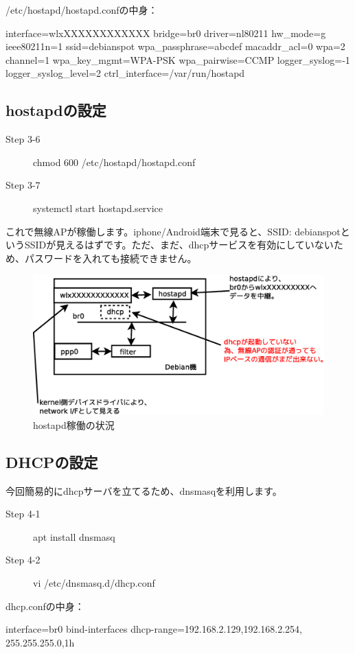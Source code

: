 \documentclass[mingoth,a4paper]{jsarticle}
\begin{document}
/etc/hostapd/hostapd.confの中身：
\begin{commandline}
interface=wlxXXXXXXXXXXXX 
bridge=br0
driver=nl80211
hw_mode=g
ieee80211n=1
ssid=debianspot
wpa_passphrase=abcdef
macaddr_acl=0
wpa=2
channel=1
wpa_key_mgmt=WPA-PSK
wpa_pairwise=CCMP
logger_syslog=-1
logger_syslog_level=2
ctrl_interface=/var/run/hostapd
\end{commandline}


\subsection{hostapdの設定}

  \begin{description}
  \item [Step 3-6] chmod 600 /etc/hostapd/hostapd.conf
  \item [Step 3-7] systemctl start hostapd.service
  \end{description}      

  これで無線APが稼働します。iphone/Android端末で見ると、SSID: debianspotというSSIDが見えるはずです。ただ、まだ、dhcpサービスを有効にしていないため、パスワードを入れても接続できません。

\begin{figure}[htbp]
\includegraphics[width=0.5\hsize]{image201512/hostapd.eps}
\caption{hostapd稼働の状況}
\end{figure}

\subsection{DHCPの設定}

  今回簡易的にdhcpサーバを立てるため、dnsmasqを利用します。
  \begin{description}
  \item [Step 4-1] apt install dnsmasq
  \item [Step 4-2] vi /etc/dnsmasq.d/dhcp.conf
  \end{description}      

dhcp.confの中身：
\begin{commandline}
interface=br0
bind-interfaces
dhcp-range=192.168.2.129,192.168.2.254,
255.255.255.0,1h
\end{commandline}
  
\end{document}
